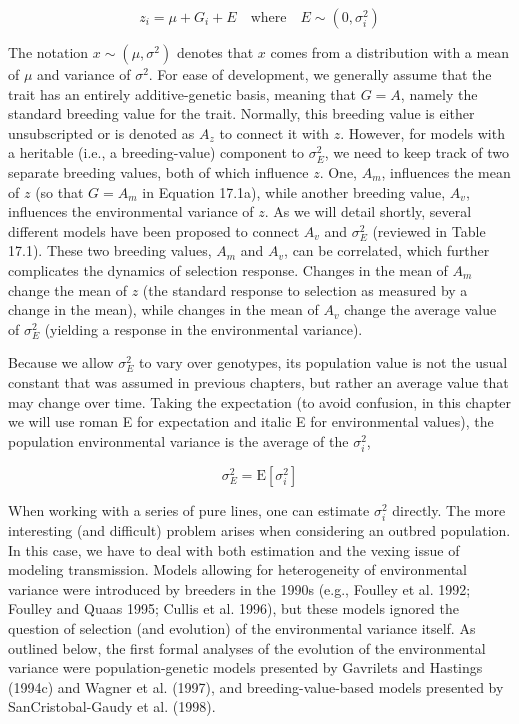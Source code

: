 \documentclass{article}
\begin{document}
\begin{equation}
z_{i}=\mu+G_{i}+E\quad\mathrm{w h e r e}\quad E\sim(0,\sigma_{i}^{2})
\tag{17.1a}
\label{eq:17_1a}
\end{equation}

The notation  $ x \sim (\mu, \sigma^2) $ denotes that  $ x $ comes from a distribution with a mean of  $ \mu $ and variance of  $ \sigma^2 $. For ease of development, we generally assume that the trait has an entirely additive-genetic basis, meaning that  $ G = A $, namely the standard breeding value for the trait. Normally, this breeding value is either unsubscripted or is denoted as  $ A_z $ to connect it with  $ z $. However, for models with a heritable (i.e., a breeding-value) component to  $ \sigma_E^2 $, we need to keep track of two separate breeding values, both of which influence  $ z $. One,  $ A_m $, influences the mean of  $ z $ (so that  $ G = A_m $ in Equation 17.1a), while another breeding value,  $ A_v $, influences the environmental variance of  $ z $. As we will detail shortly, several different models have been proposed to connect  $ A_v $ and  $ \sigma_E^2 $ (reviewed in Table 17.1). These two breeding values,  $ A_m $ and  $ A_v $, can be correlated, which further complicates the dynamics of selection response. Changes in the mean of  $ A_m $ change the mean of  $ z $ (the standard response to selection as measured by a change in the mean), while changes in the mean of  $ A_v $ change the average value of  $ \sigma_E^2 $ (yielding a response in the environmental variance).

Because we allow  $ \sigma_{E}^{2} $ to vary over genotypes, its population value is not the usual constant that was assumed in previous chapters, but rather an average value that may change over time. Taking the expectation (to avoid confusion, in this chapter we will use roman E for expectation and italic E for environmental values), the population environmental variance is the average of the  $ \sigma_{i}^{2} $,

\begin{equation}
\sigma_{E}^{2}=\mathrm{E}[\sigma_{i}^{2}]
\tag{17.1b}
\label{eq:17_1b}
\end{equation}

When working with a series of pure lines, one can estimate  $ \sigma_i^2 $ directly. The more interesting (and difficult) problem arises when considering an outbred population. In this case, we have to deal with both estimation and the vexing issue of modeling transmission. Models allowing for heterogeneity of environmental variance were introduced by breeders in the 1990s (e.g., Foulley et al. 1992; Foulley and Quaas 1995; Cullis et al. 1996), but these models ignored the question of selection (and evolution) of the environmental variance itself. As outlined below, the first formal analyses of the evolution of the environmental variance were population-genetic models presented by Gavrilets and Hastings (1994c) and Wagner et al. (1997), and breeding-value-based models presented by SanCristobal-Gaudy et al. (1998).
\end{document}
